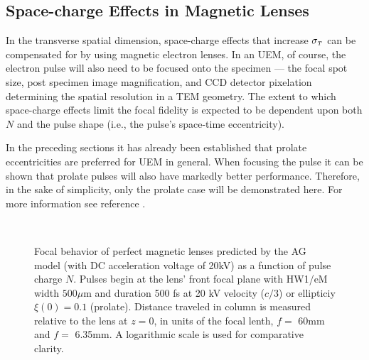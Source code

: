 \subsection{Space-charge Effects in Magnetic Lenses}

In the transverse spatial dimension, space-charge effects that increase $ \sigma_{ {\scriptscriptstyle T} } $ can be compensated for by using magnetic electron lenses.\cite{oudheusden_electron_2007,lagrange_nanosecond_2008}
In an UEM, of course, the electron pulse will also need to be focused onto the specimen --- the focal spot size, post specimen image magnification, and CCD detector pixelation determining the spatial resolution in a TEM geometry.\cite{berger_dc_2009}
The extent to which space-charge effects limit the focal fidelity is expected to be dependent upon both $N$ and the pulse shape (i.e., the pulse's space-time eccentricity).

In the preceding sections it has already been established that prolate eccentricities are preferred for UEM in general.
When focusing the pulse it can be shown that prolate pulses will also have markedly better performance.
Therefore, in the sake of simplicity, only the prolate case will be demonstrated here.
For more information see reference \cite{berger_semi-analytic_2010}.

\begin{figure}
  \centering
  \subfloat[][] {
    \label{fig:focus_lens_charge_long}
    
  }
  \\
  \subfloat[][] { 
    \label{fig:focus_lens_charge_short}
    
  }
  \caption[AG model simulated focal behavior of perfect magnetic lenses as a function of pulse charge $N$]{
    Focal behavior of perfect magnetic lenses predicted by the AG model (with DC acceleration voltage of 20kV) as a function of pulse charge $N$.
    Pulses begin at the lens' front focal plane with HW1/eM width $ 500 \mu \text{m}$ and duration 500 fs at 20 kV velocity ($c/3$) or ellipticiy $ \xi ( 0 ) = 0.1 $ (prolate).
    Distance traveled in column is measured relative to the lens at $z=0$, in units of the focal lenth,  $f = $ 60mm and  $ f = $ 6.35mm.
    A logarithmic scale is used for comparative clarity.
  }
  \label{fig:focus_lens_charge}
\end{figure}

